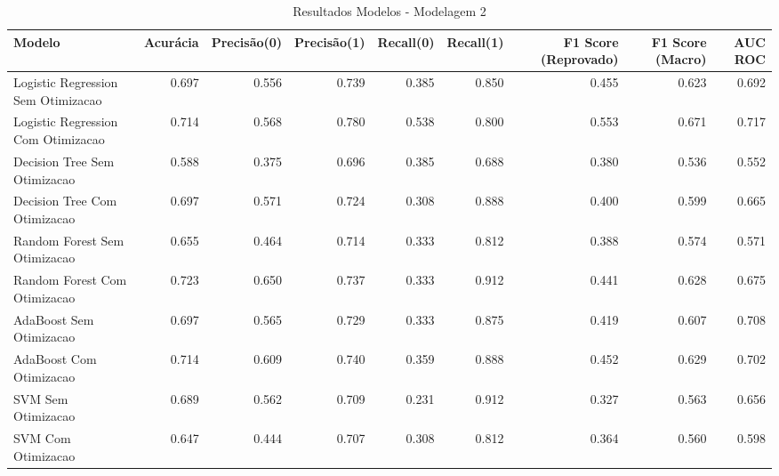 \begin{table}[H] %
    \centering
    \caption{Resultados Modelos - Modelagem 2}
    \label{tab:resultados_modelagem_2}
    \renewcommand{\arraystretch}{1.25} %
    \begin{adjustwidth}{ -1in }{ -1in } %
    \centering %
    \small %
    \begin{tabular}{lrrrrrrrr}
\toprule
                            Modelo &  Acurácia &  Precisão(0) &  Precisão(1) &  Recall(0) &  Recall(1) &  F1 Score (Reprovado) &  F1 Score (Macro) &  AUC ROC \\
\midrule
Logistic Regression Sem Otimizacao &     0.697 &        0.556 &        0.739 &      0.385 &      0.850 &                 0.455 &             0.623 &    0.692 \\
Logistic Regression Com Otimizacao &     0.714 &        0.568 &        0.780 &      0.538 &      0.800 &                 0.553 &             0.671 &    0.717 \\
      Decision Tree Sem Otimizacao &     0.588 &        0.375 &        0.696 &      0.385 &      0.688 &                 0.380 &             0.536 &    0.552 \\
      Decision Tree Com Otimizacao &     0.697 &        0.571 &        0.724 &      0.308 &      0.888 &                 0.400 &             0.599 &    0.665 \\
      Random Forest Sem Otimizacao &     0.655 &        0.464 &        0.714 &      0.333 &      0.812 &                 0.388 &             0.574 &    0.571 \\
      Random Forest Com Otimizacao &     0.723 &        0.650 &        0.737 &      0.333 &      0.912 &                 0.441 &             0.628 &    0.675 \\
           AdaBoost Sem Otimizacao &     0.697 &        0.565 &        0.729 &      0.333 &      0.875 &                 0.419 &             0.607 &    0.708 \\
           AdaBoost Com Otimizacao &     0.714 &        0.609 &        0.740 &      0.359 &      0.888 &                 0.452 &             0.629 &    0.702 \\
                SVM Sem Otimizacao &     0.689 &        0.562 &        0.709 &      0.231 &      0.912 &                 0.327 &             0.563 &    0.656 \\
                SVM Com Otimizacao &     0.647 &        0.444 &        0.707 &      0.308 &      0.812 &                 0.364 &             0.560 &    0.598 \\
\bottomrule
\end{tabular}
    \end{adjustwidth}
    \renewcommand{\arraystretch}{1.0} %
\end{table}
